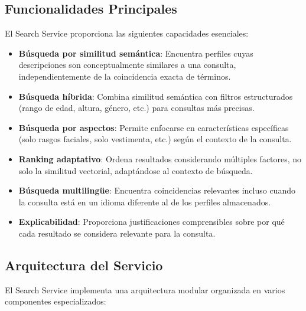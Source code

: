 \documentclass[12pt,a4paper]{article}
\begin{document}
\subsection{Funcionalidades Principales}
\label{subsec:ss-funcionalidades}

El Search Service proporciona las siguientes capacidades esenciales:

\begin{itemize}
    \item \textbf{Búsqueda por similitud semántica}: Encuentra perfiles cuyas descripciones son conceptualmente similares a una consulta, independientemente de la coincidencia exacta de términos.
    
    \item \textbf{Búsqueda híbrida}: Combina similitud semántica con filtros estructurados (rango de edad, altura, género, etc.) para consultas más precisas.
    
    \item \textbf{Búsqueda por aspectos}: Permite enfocarse en características específicas (solo rasgos faciales, solo vestimenta, etc.) según el contexto de la consulta.
    
    \item \textbf{Ranking adaptativo}: Ordena resultados considerando múltiples factores, no solo la similitud vectorial, adaptándose al contexto de búsqueda.
    
    \item \textbf{Búsqueda multilingüe}: Encuentra coincidencias relevantes incluso cuando la consulta está en un idioma diferente al de los perfiles almacenados.
    
    \item \textbf{Explicabilidad}: Proporciona justificaciones comprensibles sobre por qué cada resultado se considera relevante para la consulta.
\end{itemize}

\subsection{Arquitectura del Servicio}
\label{subsec:ss-arquitectura}

El Search Service implementa una arquitectura modular organizada en varios componentes especializados:
\end{document}
